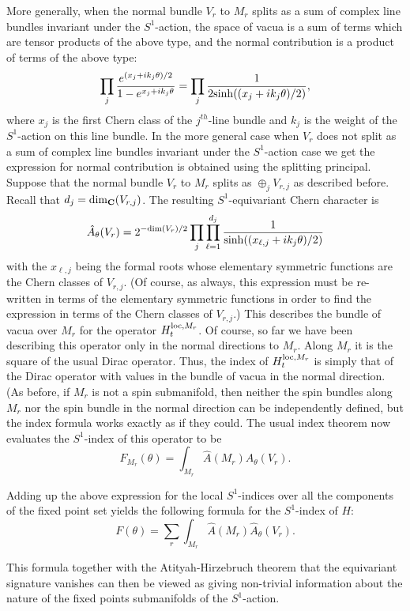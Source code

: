 More generally, when the normal bundle $V_r$ to $M_r$ splits as a sum
of complex line bundles invariant under the $S^1$-action, the space of
vacua is a sum of terms which are tensor products of the above type,
and the normal contribution is a  product 
of terms of the above type:
$$\prod_j\frac{e^{(x_j+ik_j\theta)/2}}{1-e^{x_j+ik_j\theta}}=\prod_j
\frac{1}{2{\rm sinh}((x_j+ik_j\theta)/2)},$$
where $x_j$ is the first Chern class of the $j^{th}$-line bundle and 
$k_j$ is the weight of the $S^1$-action on this line bundle.
In the more general case when $V_r$
does not split as a sum of complex line bundles invariant under the
$S^1$-action case we get
the expression for normal contribution is obtained using the splitting
principal. 
Suppose that the normal bundle $V_r$  to $M_r$ splits as $\oplus_j
V_{r,j}$ as described before.
Recall that $d_j={\rm dim}_{\bf C}(V_{r,j})$.
The resulting $S^1$-equivariant Chern character is
$$\hat A_\theta(V_r)=2^{-{\rm dim}(V_r)/2}\prod_{j}\prod_{\ell=1}^{d_j}
\frac{1}{{\rm sinh}((x_{\ell,j}+ik_j\theta)/2) }$$
with the $x_{\ell,j}$ being the formal roots whose elementary
symmetric functions are the Chern classes of $V_{r,j}$.
(Of course, as always, this expression must be re-written in terms of
the elementary symmetric functions in order to find the expression in
terms of the Chern classes of $V_{r,j}$.)
This describes the  bundle of
vacua over $M_r$ for the operator $H_t^{{\rm loc},M_r}$. 
Of course, so far we have been describing this operator  only in the
normal directions to $M_r$.  Along $M_r$ it is the square of the usual
Dirac operator.  Thus, the  index of $H_t^{{\rm loc}, M_r}$ is simply
that of the Dirac operator with values in the bundle of vacua
in the normal direction. (As before, if $M_r$ is not a spin
submanifold, then neither the spin bundles along $M_r$ nor the spin
bundle in the normal direction can be independently defined, but the
index formula works exactly as if they could.
The usual index theorem now evaluates the $S^1$-index of this operator  to
be
$$F_{M_r}(\theta)=\int_{M_r}\hat A(M_r)\hat A_{\theta}(V_r).$$

Adding up the above
expression for the local $S^1$-indices
over all the components of the fixed point set
yields the following  formula for the $S^1$-index of $H$:
\begin{equation}\label{genform}
F(\theta)=\sum_r\int_{M_r}\hat A(M_r)\hat A_{\theta}(V_r).
\end{equation}

This formula together with the  Atityah-Hirzebruch theorem that the
equivariant signature vanishes can then be viewed as giving
non-trivial information about the nature of the fixed points
submanifolds of the $S^1$-action.


